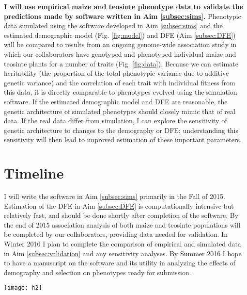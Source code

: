 {\bf I will use empirical maize and teosinte phenotype data to validate the predictions made by software written in Aim \ref{subsec:sims}.} 
Phenotypic data simulated using the software developed in Aim \ref{subsec:sims} and the estimated demographic model (Fig. \ref{fig:model}) and DFE (Aim \ref{subsec:DFE}) will be compared to results from an ongoing genome-wide association study in which our collaborators have genotyped and phenotyped individual maize and teosinte plants for a number of traits (Fig. \ref{fig:data}).
Because we can estimate heritability (the proportion of the total phenotypic variance due to additive genetic variance) and the correlation of each trait with individual fitness from this data, it is directly comparable to phenotypes evolved using the simulation software. 
If the estimated demographic model and DFE are reasonable, the genetic architecture of simulated phenotypes should closely mimic that of real data.
If the real data differ from simulation, I can explore the sensitivity of genetic architecture to changes to the demography or DFE; understanding this sensitivity will then lead to improved estimation of these important parameters.

\section*{Timeline}
I will write the software in Aim \ref{subsec:sims} primarily in the Fall of 2015. 
Estimation of the DFE in Aim \ref{subsec:DFE} is computationally intensive but relatively fast, and should be done shortly after completion of the software.
By the end of 2015 association analysis of both maize and teosinte populations will be completed by our collaborators, providing data needed for validation.
In Winter 2016 I plan to complete the comparison of empirical and simulated data in Aim \ref{subsec:validation} and any sensitivity analyses.  
By Summer 2016 I hope to have a manuscript on the software and its utility in analyzing the effects of demography and selection on phenotypes ready for submission.

\begin{SCfigure}
\centering
   \texttt{[image: h2]}
  \caption{Estimates of the proportion of phenotypic variance due to additive (h2) and dominance (Vd\_Vp) effects and the percentage inbreeding depression  (ID\_perc) are shown for each of 16 phenotypes measured in a natural population of teosinte.}
  \label{fig:data}
\end{SCfigure}


\pagebreak

%